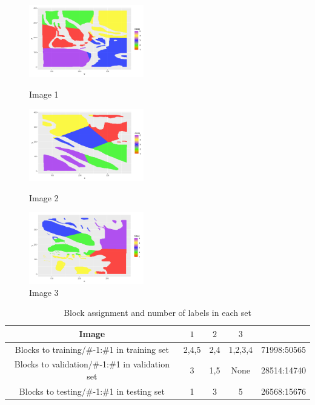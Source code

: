 \documentclass[11pt]{article}
\theoremstyle{definition}
\begin{document}
\begin{figure}[h]
\begin{minipage}[t]{0.33\textwidth}
\centering
\includegraphics[width=5cm]{figures/2a2.png}
\caption{Image 1}
\label{2a2}
\end{minipage}
\begin{minipage}[t]{0.33\textwidth}
\centering
\includegraphics[width=5cm]{figures/2a3.png}
\caption{Image 2}
\label{2a3}
\end{minipage}
\begin{minipage}[t]{0.33\textwidth}
\centering
\includegraphics[width=5cm]{figures/2a4.png}
\caption{Image 3}
\label{2a4}
\end{minipage}
\end{figure}
\FloatBarrier 

\begin{table}[h]
    \centering
    \begin{tabular}{c||c|c|c||c}
    Image
    & $1$
    & $2$
    & $3$ 
    &\\
    \hline
    \hline
    Blocks to training/\#-1:\#1 in training set
    & 2,4,5
    & 2,4
    & 1,2,3,4 
    & 71998:50565\\
    \hline
    Blocks to validation/\#-1:\#1 in validation set
    & 3
    & 1,5
    & None 
    & 28514:14740\\
    \hline
    Blocks to testing/\#-1:\#1 in testing set 
    & 1
    & 3
    & 5
    & 26568:15676

    \end{tabular}
    \caption{Block assignment and number of labels in each set}
    \label{tab3}
\end{table}
\FloatBarrier
\end{document}
